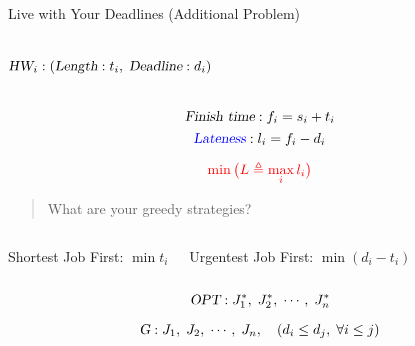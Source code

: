 
\begin{frame}{}
  \begin{exampleblock}{Live with Your Deadlines (Additional Problem)}
    \begin{columns}
        \pause
        \pause
	\[
	  \textsl{HW}_{i}: (\textsl{Length}: t_{i},\; \textsl{Deadline}: d_{i})
	\]
	\vspace{-0.60cm}
    \end{columns}
  \end{exampleblock}

  \pause
  \[
    \textsl{Finish time}: f_{i} = s_{i} + t_{i}
  \]
  \[
    \textcolor{blue}{\textsl{Lateness}}: l_i = f_{i} - d_{i}
  \]

  \pause
  \[
    \textcolor{red}{\min \big(L \triangleq \max_{i} l_i\big)}
  \]
\end{frame}

\begin{frame}{}
  \begin{quote}
    \centering
    {\Large What are your greedy strategies?}
  \end{quote}

\end{frame}

\begin{frame}{}
  \begin{columns}
      \centerline{\large Shortest Job First: $\min t_{i}$}
      \centerline{\large Urgentest Job First: $\min (d_{i} - t_{i})$}
  \end{columns}
\end{frame}

\begin{frame}{}
  \begin{quote}
    \centering
    {\Large {}}
  \end{quote}

\end{frame}

\begin{frame}{}
  \begin{center}
  \end{center}

  \[
    \textsl{OPT}: J_{1}^{\ast},\; J_{2}^{\ast},\; \cdots,\; J_{n}^{\ast}
  \]

  \[
    \textsl{G}: J_1,\; J_2,\; \cdots,\; J_n, \quad (d_i \le d_j,\; \forall i \le j)
  \]
\end{frame}

